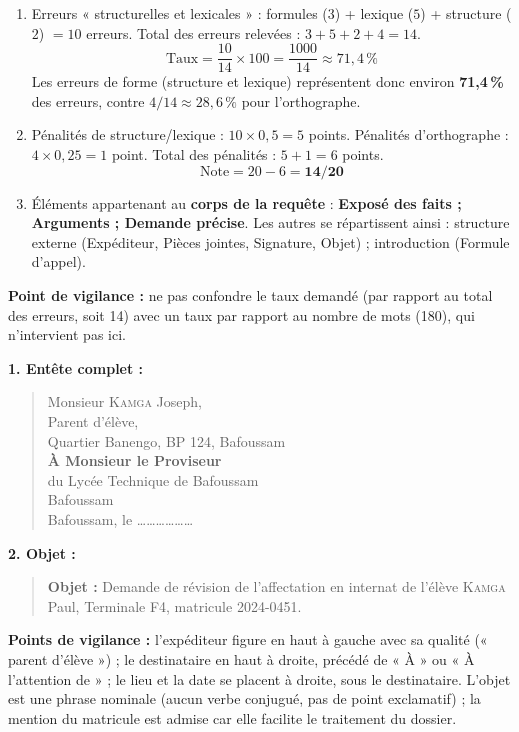 \documentclass[11pt]{article}
\newcommand{\cle}[1]{{\popxbold\color{popdark}#1}}
\begin{document}
\begin{corrige}
\begin{enumerate}
    \item Erreurs « structurelles et lexicales » : formules ($3$) + lexique ($5$) + structure ($2$) $= 10$ erreurs. Total des erreurs relevées : $3 + 5 + 2 + 4 = 14$.
    \[ \text{Taux} = \frac{10}{14} \times 100 = \frac{1000}{14} \approx 71,4\,\% \]
    Les erreurs de forme (structure et lexique) représentent donc environ \textbf{71,4\,\%} des erreurs, contre $4/14 \approx 28,6\,\%$ pour l'orthographe.
    \item Pénalités de structure/lexique : $10 \times 0,5 = 5$ points. Pénalités d'orthographe : $4 \times 0,25 = 1$ point. Total des pénalités : $5 + 1 = 6$ points.
    \[ \text{Note} = 20 - 6 = \textbf{14/20} \]
    \item Éléments appartenant au \textbf{corps de la requête} : \textbf{Exposé des faits ; Arguments ; Demande précise}. Les autres se répartissent ainsi : structure externe (Expéditeur, Pièces jointes, Signature, Objet) ; introduction (Formule d'appel).
\end{enumerate}
\textbf{Point de vigilance :} ne pas confondre le taux demandé (par rapport au total des erreurs, soit 14) avec un taux par rapport au nombre de mots (180), qui n'intervient pas ici.
\end{corrige}

\begin{corrige}
\textbf{1. Entête complet :}
\begin{quote}
Monsieur \textsc{Kamga} Joseph,\\
Parent d'élève,\\
Quartier Banengo, BP 124, Bafoussam\\[0.5em]
\hspace*{6cm}\textbf{À Monsieur le Proviseur}\\
\hspace*{6cm}du Lycée Technique de Bafoussam\\
\hspace*{6cm}Bafoussam\\[0.5em]
\hspace*{6cm}Bafoussam, le \ldots\ldots\ldots\ldots\ldots\ldots
\end{quote}
\textbf{2. Objet :}
\begin{quote}
\textbf{Objet :} Demande de révision de l'affectation en internat de l'élève \textsc{Kamga} Paul, Terminale F4, matricule 2024-0451.
\end{quote}
\textbf{Points de vigilance :} l'expéditeur figure en haut à gauche avec sa qualité (« parent d'élève ») ; le destinataire en haut à droite, précédé de « À » ou « À l'attention de » ; le lieu et la date se placent à droite, sous le destinataire. L'objet est une \cle{phrase nominale} (aucun verbe conjugué, pas de point exclamatif) ; la mention du matricule est admise car elle facilite le traitement du dossier.
\end{corrige}
\end{document}
